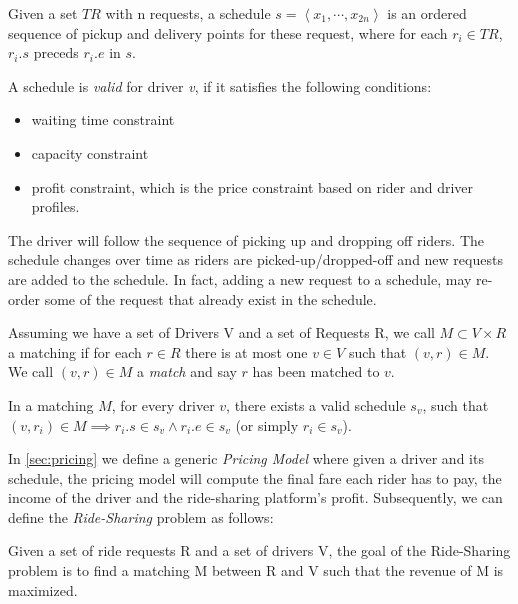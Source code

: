 \begin{definition} [Schedule]
Given a set $TR$ with n requests, a schedule $s= \left\langle x_1, \cdots, x_{2n} \right\rangle$ is an ordered sequence of pickup and delivery points for these request, where for each $r_i \in TR$, $r_i.s$ preceds $r_i.e$ in $s$. 
\end{definition}

A schedule is \textit{valid} for driver \textit{v}, if it satisfies the following conditions:

\begin{itemize}
\item waiting time constraint
\item capacity constraint
\item profit constraint, which is the price constraint based on rider and driver profiles. 
\end{itemize}

The driver will follow the sequence of picking up and dropping off riders. The schedule changes over time as riders are picked-up/dropped-off and new requests are added to the schedule. In fact, adding a new request to a schedule, may re-order some of the request that already exist in the schedule.

\begin{definition} [Matching]
Assuming we have a set of Drivers V and a set of Requests R, we call $M \subset V \times R$ a matching if for each $r \in R$ there is at most one $v \in V$ such that $\left( v, r \right) \in M$. We call $\left( v, r \right) \in M$ a \emph{match} and say $r$ has been matched to $v$.
\end{definition}

\noindent In a matching $M$, for every driver $v$, there exists a valid schedule $s_v$, such that $(v, r_i) \in M \implies r_i.s \in s_v \wedge r_i.e \in s_v$ (or simply $r_i \in s_v$). 

In \cref{sec:pricing} we define a generic \textit{Pricing Model} where given a driver and its schedule, the pricing model will compute the final fare each rider has to pay, the income of the driver and the ride-sharing platform's profit. Subsequently, we can define the \textit{Ride-Sharing} problem as follows:

\begin{definition} 
Given a set of ride requests R and a set of drivers V, the goal of the Ride-Sharing problem is to find a matching M between R and V such that the revenue of M is maximized.
\end{definition}

